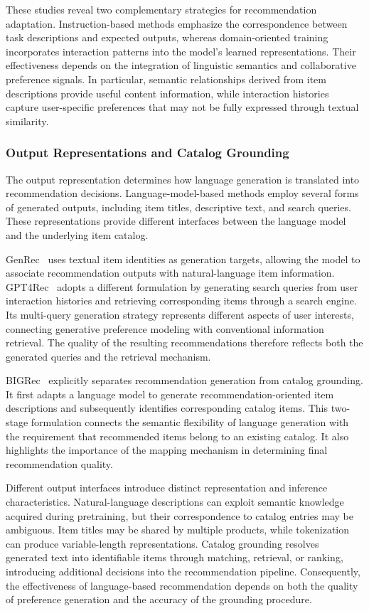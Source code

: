 \documentclass[sigconf,nonacm]{acmart}
\begin{document}
These studies reveal two complementary strategies for
recommendation adaptation. Instruction-based methods emphasize
the correspondence between task descriptions and expected
outputs, whereas domain-oriented training incorporates
interaction patterns into the model's learned representations.
Their effectiveness depends on the integration of linguistic
semantics and collaborative preference signals. In particular,
semantic relationships derived from item descriptions provide
useful content information, while interaction histories capture
user-specific preferences that may not be fully expressed
through textual similarity.

\subsubsection{Output Representations and Catalog Grounding}

The output representation determines how language generation
is translated into recommendation decisions. Language-model-based
methods employ several forms of generated outputs, including
item titles, descriptive text, and search queries. These
representations provide different interfaces between the
language model and the underlying item catalog.

GenRec~\cite{genrec} uses textual item identities as generation
targets, allowing the model to associate recommendation outputs
with natural-language item information. GPT4Rec~\cite{gpt4rec}
adopts a different formulation by generating search queries
from user interaction histories and retrieving corresponding
items through a search engine. Its multi-query generation
strategy represents different aspects of user interests,
connecting generative preference modeling with conventional
information retrieval. The quality of the resulting
recommendations therefore reflects both the generated queries
and the retrieval mechanism.

BIGRec~\cite{bigrec} explicitly separates recommendation
generation from catalog grounding. It first adapts a language
model to generate recommendation-oriented item descriptions
and subsequently identifies corresponding catalog items.
This two-stage formulation connects the semantic flexibility
of language generation with the requirement that recommended
items belong to an existing catalog. It also highlights the
importance of the mapping mechanism in determining final
recommendation quality.

Different output interfaces introduce distinct representation
and inference characteristics. Natural-language descriptions
can exploit semantic knowledge acquired during pretraining,
but their correspondence to catalog entries may be ambiguous.
Item titles may be shared by multiple products, while
tokenization can produce variable-length representations.
Catalog grounding resolves generated text into identifiable
items through matching, retrieval, or ranking, introducing
additional decisions into the recommendation pipeline.
Consequently, the effectiveness of language-based recommendation
depends on both the quality of preference generation and the
accuracy of the grounding procedure.
\end{document}
